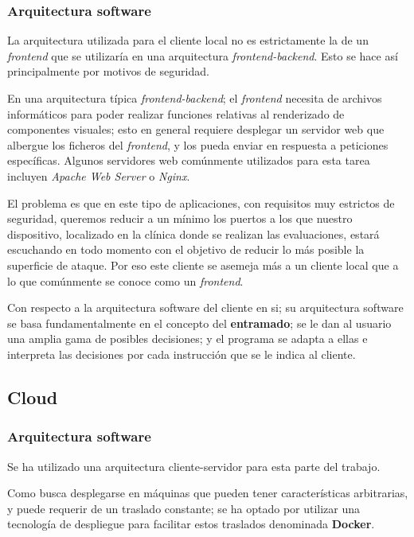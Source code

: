 \documentclass[12pt,a4paper,twoside,openright]{book}
\begin{document}
\subsubsection{Arquitectura software}

La arquitectura utilizada para el cliente local no es estrictamente la de un \textit{frontend} que se utilizaría en una arquitectura \textit{frontend-backend}. Esto se hace así principalmente por motivos de seguridad.

En una arquitectura típica \textit{frontend-backend}; el \textit{frontend} necesita de archivos informáticos para poder realizar funciones relativas al renderizado de componentes visuales; esto en general requiere desplegar un servidor web que albergue los ficheros del \textit{frontend}, y los pueda enviar en respuesta a peticiones específicas. Algunos servidores web comúnmente utilizados para esta tarea incluyen \textit{Apache Web Server} o \textit{Nginx}.

El problema es que en este tipo de aplicaciones, con requisitos muy estrictos de seguridad, queremos reducir a un mínimo los puertos a los que nuestro dispositivo, localizado en la clínica donde se realizan las evaluaciones, estará escuchando en todo momento con el objetivo de reducir lo más posible la superficie de ataque. Por eso este cliente se asemeja más a un cliente local que a lo que comúnmente se conoce como un \textit{frontend}.

Con respecto a la arquitectura software del cliente en si; su arquitectura software se basa fundamentalmente en el concepto del \textbf{entramado}; se le dan al usuario una amplia gama de posibles decisiones; y el programa se adapta a ellas e interpreta las decisiones por cada instrucción que se le indica al cliente.

\subsection{Cloud}

\subsubsection{Arquitectura software}

Se ha utilizado una arquitectura cliente-servidor para esta parte del trabajo.

Como busca desplegarse en máquinas que pueden tener características arbitrarias, y puede requerir de un traslado constante; se ha optado por utilizar una tecnología de despliegue para facilitar estos traslados denominada \textbf{Docker}.
\end{document}
